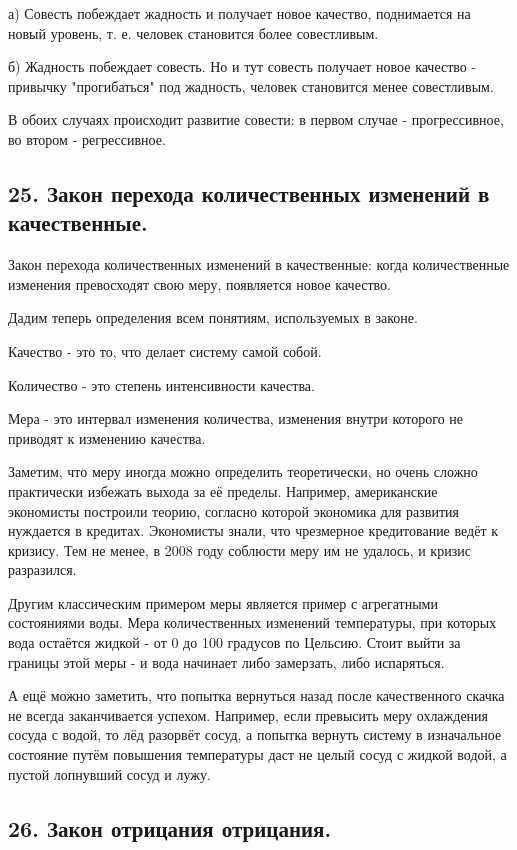\documentclass[a4paper, 12pt]{article}
\begin{document}
а) Совесть побеждает жадность и получает новое качество, поднимается на новый уровень, т. е. человек становится более совестливым.

б) Жадность побеждает совесть. Но и тут совесть получает новое качество - привычку "прогибаться" под жадность, человек становится менее совестливым.

В обоих случаях происходит развитие совести: в первом случае - прогрессивное, во втором - регрессивное.


\subsection*{\textbf{25. Закон перехода количественных изменений в качественные.}}

Закон перехода количественных изменений в качественные:
когда количественные изменения превосходят свою меру, появляется новое качество.

Дадим теперь определения всем понятиям, используемых в законе.

Качество - это то, что делает систему самой собой.

Количество - это степень интенсивности качества.

Мера - это интервал изменения количества, изменения внутри которого не приводят к изменению качества.

Заметим, что меру иногда можно определить теоретически, но очень сложно практически избежать выхода за её пределы.
Например, американские экономисты построили теорию, согласно которой экономика для развития нуждается в кредитах.
Экономисты знали, что чрезмерное кредитование ведёт к кризису.
Тем не менее, в 2008 году соблюсти меру им не удалось, и кризис разразился.

Другим классическим примером меры является пример с агрегатными состояниями воды.
Мера количественных изменений температуры, при которых вода остаётся жидкой - от 0 до 100 градусов по Цельсию.
Стоит выйти за границы этой меры - и вода начинает либо замерзать, либо испаряться.

А ещё можно заметить, что попытка вернуться назад после качественного скачка не всегда заканчивается успехом.
Например, если превысить меру охлаждения сосуда с водой, то лёд разорвёт сосуд, а попытка вернуть систему в изначальное состояние путём повышения температуры даст не целый сосуд с жидкой водой, а пустой лопнувший сосуд и лужу.


\subsection*{\textbf{26. Закон отрицания отрицания.}}
\end{document}
